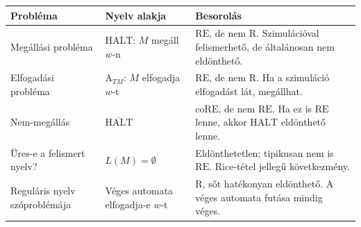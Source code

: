 \small
\begin{tabularx}{\textwidth}{L{32mm}L{38mm}X}
\toprule
\textbf{Probléma} & \textbf{Nyelv alakja} & \textbf{Besorolás} \\
\midrule
Megállási probléma & $\mathrm{HALT}$: $M$ megáll $w$-n & $\mathrm{RE}$, de nem $\mathrm{R}$. Szimulációval felismerhető, de általánosan nem eldönthető. \\
Elfogadási probléma & $\mathrm{A}_{TM}$: $M$ elfogadja $w$-t & $\mathrm{RE}$, de nem $\mathrm{R}$. Ha a szimuláció elfogadást lát, megállhat. \\
Nem-megállás & $\overline{\mathrm{HALT}}$ & $\mathrm{coRE}$, de nem $\mathrm{RE}$. Ha ez is $\mathrm{RE}$ lenne, akkor $\mathrm{HALT}$ eldönthető lenne. \\
Üres-e a felismert nyelv? & $L(M)=\emptyset$ & Eldönthetetlen; tipikusan nem is $\mathrm{RE}$. Rice-tétel jellegű következmény. \\
Reguláris nyelv szóproblémája & Véges automata elfogadja-e $w$-t & $\mathrm{R}$, sőt hatékonyan eldönthető. A véges automata futása mindig véges. \\
\bottomrule
\end{tabularx}
\normalsize

